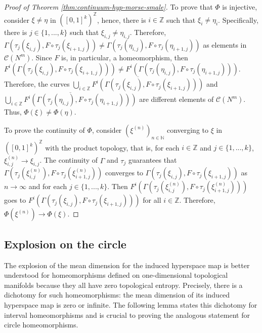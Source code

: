 \documentclass[sn-mathphys-num]{sn-jnl}%
\theoremstyle{thmstyleone}%
\theoremstyle{thmstyletwo}%
\theoremstyle{thmstylethree}%
\newcommand*\hyp[1]{\mathcal{#1}}
\begin{document}
\begin{proof}[Proof of Theorem \emph{\ref{thm:continuum-hyp-morse-smale}}]
    To prove that $\Phi$ is injective, consider $\xi \neq \eta$ in $([0, 1]^k)^{\mathbb{Z}}$, hence, there is $i \in \mathbb{Z}$ such that $\xi_i \neq \eta_i$. Specifically, there is $j \in \{1, ..., k\}$ such that $\xi_{i, j} \neq \eta_{i, j}$. Therefore, $\Gamma(\tau_j(\xi_{i, j}), F\circ\tau_j(\xi_{i + 1, j})) \neq \Gamma(\tau_j(\eta_{i, j}), F\circ\tau_j(\eta_{i + 1, j}))$ as elements in $\hyp{C}(N^m)$. Since $F$ is, in particular, a homeomorphism, then $F^i(\Gamma(\tau_j(\xi_{i, j}), F\circ\tau_j(\xi_{i + 1, j}))) \neq F^i(\Gamma(\tau_j(\eta_{i, j}), F\circ\tau_j(\eta_{i + 1, j})))$. Therefore, the curves $\overline{ \bigcup\limits_{i \in \mathbb{Z}}  F^i(\Gamma(\tau_j(\xi_{i, j}), F\circ\tau_j(\xi_{i + 1, j})))}$ and $\overline{ \bigcup\limits_{i \in \mathbb{Z}}  F^i(\Gamma(\tau_j(\eta_{i, j}), F\circ\tau_j(\eta_{i + 1, j})))}$ are different elements of $\hyp{C}(N^m)$. Thus, $\Phi(\xi) \neq \Phi(\eta)$.

    To prove the continuity of $\Phi$, consider $(\xi^{(n)})_{n \in \mathbb{N}}$ converging to $\xi$ in $([0, 1]^k)^{\mathbb{Z}}$ with the product topology, that is, for each $i \in \mathbb{Z}$ and $j \in \{1, ..., k\}$, $\xi^{(n)}_{i,j} \to \xi_{i, j}$. The continuity of $\Gamma$ and $\tau_j$ guarantees that $\Gamma(\tau_j(\xi^{(n)}_{i,j}), F\circ\tau_j(\xi^{(n)}_{i + 1,j}))$ converges to $\Gamma(\tau_j(\xi_{i,j}), F\circ\tau_j(\xi_{i + 1,j}))$ as $n \to \infty$ and for each $j \in \{1, ..., k\}$. Then $F^i(\Gamma(\tau_j(\xi^{(n)}_{i,j}), F\circ\tau_j(\xi^{(n)}_{i + 1,j})))$ goes to $F^i(\Gamma(\tau_j(\xi_{i,j}), F\circ\tau_j(\xi_{i + 1,j})))$ for all $i \in \mathbb{Z}$. Therefore, $\Phi(\xi^{(n)}) \to \Phi(\xi)$.
\end{proof}

\subsection{Explosion on the circle}\label{subsec:explosion-circle}

The explosion of the mean dimension for the induced hyperspace map is better understood for homeomorphisms defined on one-dimensional topological manifolds because they all have zero topological entropy. Precisely, there is a dichotomy for such homeomorphisms: the mean dimension of its induced hyperspace map is zero or infinite. The following lemma states this dichotomy for interval homeomorphisms and is crucial to proving the analogous statement for circle homeomorphisms.\\
\end{document}
